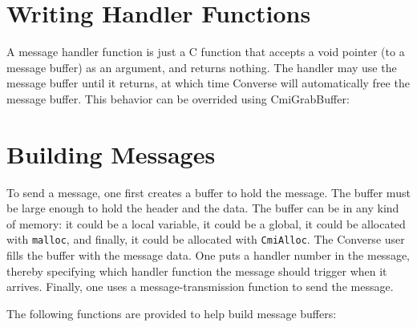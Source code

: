 \section{Writing Handler Functions}
\label{handler2}

A message handler function is just a C function that accepts a void
pointer (to a message buffer) as an argument, and returns nothing.  The
handler may use the message buffer until it returns, at which time
Converse will automatically free the message buffer.  This behavior
can be overrided using CmiGrabBuffer:


\section{Building Messages}

To send a message, one first creates a buffer to hold the message.
The buffer must be large enough to hold the header and the data.
The buffer can be in any kind of memory: it could be a local variable,
it could be a global, it could be allocated with {\tt malloc}, and
finally, it could be allocated with {\tt CmiAlloc}.  The Converse user
fills the buffer with the message data.  One puts a handler number
in the message, thereby specifying which handler function the message
should trigger when it arrives.  Finally, one uses a message-transmission
function to send the message.

The following functions are provided to help build message buffers:


